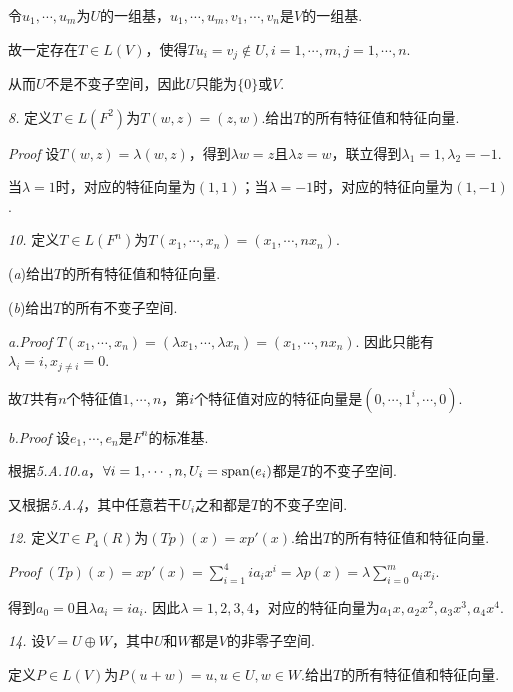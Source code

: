 令\(u_1,\cdots,u_m\)为\(U\)的一组基，\(u_1,\cdots,u_m,v_1,\cdots,v_n\)是\(V\)的一组基.

故一定存在\(T \in L(V)\)，使得\(Tu_i=v_j \notin U,i=1,\cdots,m,j=1,\cdots,n\).

从而\(U\)不是不变子空间，因此\(U\)只能为\(\{0\}\)或\(V\).

\hspace*{\fill}

\textit{8.}
定义\(T \in L(F^2)\)为\(T(w,z)=(z,w)\).给出\(T\)的所有特征值和特征向量.

\textit{Proof}
设\(T(w,z)=\lambda(w,z)\)，得到\(\lambda w=z\)且\(\lambda z=w\)，联立得到\(\lambda_1=1,\lambda_2=-1\).

当\(\lambda=1\)时，对应的特征向量为\((1,1)\)；当\(\lambda=-1\)时，对应的特征向量为\((1,-1)\).

\newpage

\textit{10.}
定义\(T \in L(F^n)\)为\(T(x_1,\cdots,x_n)=(x_1,\cdots,nx_n)\).

(\textit{a})给出\(T\)的所有特征值和特征向量.

(\textit{b})给出\(T\)的所有不变子空间.

\textit{a.Proof}
\(T(x_1,\cdots,x_n)=(\lambda x_1,\cdots,\lambda x_n)=(x_1,\cdots,nx_n)\).
因此只能有\(\lambda_i=i,x_{j \ne i}=0\).

故\(T\)共有\(n\)个特征值\(1,\cdots,n\)，第\(i\)个特征值对应的特征向量是\((0,\cdots,1^i,\cdots,0)\).

\textit{b.Proof}
设\(e_1,\cdots,e_n\)是\(F^n\)的标准基.

根据\textit{5.A.10.a}，\(\forall i=1,\cdots,n,U_i=\mathrm{span} (e_i)\)都是\(T\)的不变子空间.

又根据\textit{5.A.4}，其中任意若干\(U_i\)之和都是\(T\)的不变子空间.

\hspace*{\fill}

\textit{12.}
定义\(T \in P_4(R)\)为\((Tp)(x)=xp'(x)\).给出\(T\)的所有特征值和特征向量.

\textit{Proof}
\((Tp)(x)=xp'(x)=\sum_{i=1}^4 ia_ix^i=\lambda p(x)=\lambda \sum_{i=0}^m a_ix_i\).

得到\(a_0=0\)且\(\lambda a_i=i a_i\).
因此\(\lambda=1,2,3,4\)，对应的特征向量为\(a_1x,a_2x^2,a_3x^3,a_4x^4\).

\hspace*{\fill}

\textit{14.}
设\(V=U \oplus W\)，其中\(U\)和\(W\)都是\(V\)的非零子空间.

定义\(P \in L(V)\)为\(P(u+w)=u,u \in U,w \in W\).给出\(T\)的所有特征值和特征向量.

